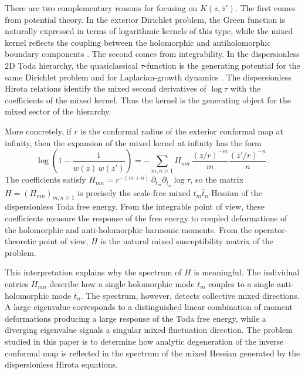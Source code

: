 \documentclass[11pt]{amsart}
\numberwithin{equation}{section}
\theoremstyle{plain}
\theoremstyle{definition}
\theoremstyle{remark}
\begin{document}
There are two complementary reasons for focusing on \(K(z,\bar z')\).  The
first comes from potential theory. In the exterior Dirichlet problem, the Green function is naturally expressed
in terms of logarithmic kernels of this type, while the mixed kernel reflects
the coupling between the holomorphic and antiholomorphic boundary components
\cite{Bell1992,Jeong2007}.  The second
comes from integrability.  In the dispersionless \(2\)D Toda hierarchy, the
quasiclassical \(\tau\)-function is the generating potential for the same
Dirichlet problem and for Laplacian-growth dynamics
\cite{MineevWeinstein2000,WiegmannZabrodin2000,MarshakovWiegmannZabrodin2002,BOOKtau,TakasakiTakebe1995,Teo2003,Teo2009}.
The dispersionless Hirota relations identify the mixed second derivatives of
\(\log\tau\) with the coefficients of the mixed kernel.  Thus the kernel is
the generating object for the
mixed sector of the hierarchy.

More concretely, if \(r\) is the conformal radius of the exterior conformal map at infinity, then the
expansion of the mixed kernel at infinity has the form
\begin{equation}\label{eq:intro-mixed-kernel}
	\log\!\left(1-\frac{1}{w(z)\,\overline{w(z')}}\right)
	=
	-\sum_{m,n\ge1} H_{mn}\,
	\frac{(z/r)^{-m}}{m}\frac{(\bar z'/r)^{-n}}{n}.
\end{equation}
The coefficients satisfy
\(H_{mn}=r^{-(m+n)}\,\partial_{t_m}\partial_{\bar t_n}\log\tau\), so the matrix
\(H=(H_{mn})_{m,n\ge1}\) is precisely the scale-free mixed
\(t_m\bar t_n\)-Hessian of the dispersionless Toda free energy.  From the
integrable point of view, these coefficients measure the response of the free
energy to coupled deformations of the holomorphic and anti-holomorphic
harmonic moments.  From the operator-theoretic point of view, \(H\) is the
natural mixed susceptibility matrix of the problem.

This interpretation explains why the spectrum of \(H\) is meaningful. The
individual entries \(H_{mn}\) describe how a single holomorphic mode \(t_m\)
couples to a single anti-holomorphic mode \(\bar t_n\). The spectrum,
however, detects collective mixed directions. A large eigenvalue corresponds
to a distinguished linear combination of moment deformations producing a large
response of the Toda free energy, while a diverging eigenvalue signals a
singular mixed fluctuation direction. The problem studied in this paper is to
determine how analytic degeneration of the inverse conformal map is reflected
in the spectrum of the mixed Hessian generated by the dispersionless Hirota
equations.
\end{document}
